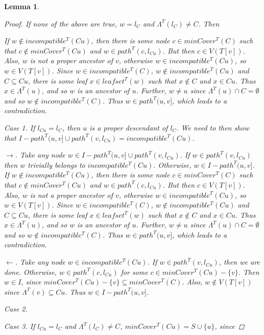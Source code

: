 \documentclass{article}
\newcommand{\leafset}{\Lambda}
\newtheorem{incompatibilityrecursive}[incompatibility]{Lemma}
\begin{document}
\begin{incompatibilityrecursive}
\begin{proof}
            If none of the above are true, $w = l_C$ and $\leafset^{T}(l_C) \neq C$. Then

            If $w \not\in incompatible^{T}(Cu)$, then there is some node $c \in minCover^{T}(C)$ such that $c \not\in minCover^{T}(Cu)$ and $w \in path^{T}(c, l_{Cu})$. But then $c \in V(T[v])$. Also, $w$ is not a proper ancestor of $v$, otherwise $w \in incompatible^{T}(Cu)$, so $w \in V(T[v])$. Since $w \in incompatible^{T}(C)$, $w \not\in incompatible^{T}(Cu)$ and $C \subseteq Cu$, there is some leaf $x \in leafset^{T}(w)$ such that $x \not\in C$ and $x \in Cu$. Thus $x \in \leafset^{T}(u)$, and so $w$ is an ancestor of $u$. Further, $w \neq u$ since $\leafset^{T}(u) \cap C = \emptyset$ and so $w \not\in incompatible^{T}(C)$. Thus $w \in path^{T}(u, v]$, which leads to a contradiction.

            \textit{Case 1.} If $l_{Cu} = l_C$, then $u$ is a proper descendant of $l_C$.  We need to then show that $I - path^{T}(u, v] \cup path^{T}(v, l_{Cu}) = incompatible^{T}(Cu)$.

            $\longrightarrow$. Take any node $w \in I - path^{T}(u, v] \cup path^{T}(v, l_{Cu})$. If $w \in path^{T}(v, l_{Cu})$ then $w$ trivially belongs to $incompatible^{T}(Cu)$. Otherwise, $w \in I - path^{T}(u, v]$. If $w \not\in incompatible^{T}(Cu)$, then there is some node $c \in minCover^{T}(C)$ such that $c \not\in minCover^{T}(Cu)$ and $w \in path^{T}(c, l_{Cu})$. But then $c \in V(T[v])$. Also, $w$ is not a proper ancestor of $v$, otherwise $w \in incompatible^{T}(Cu)$, so $w \in V(T[v])$. Since $w \in incompatible^{T}(C)$, $w \not\in incompatible^{T}(Cu)$ and $C \subseteq Cu$, there is some leaf $x \in leafset^{T}(w)$ such that $x \not\in C$ and $x \in Cu$. Thus $x \in \leafset^{T}(u)$, and so $w$ is an ancestor of $u$. Further, $w \neq u$ since $\leafset^{T}(u) \cap C = \emptyset$ and so $w \not\in incompatible^{T}(C)$. Thus $w \in path^{T}(u, v]$, which leads to a contradiction.

            $\longleftarrow$. Take any node $w \in incompatible^{T}(Cu)$. If $w \in path^{T}(v, l_{Cu})$, then we are done. Otherwise, $w \in path^{T}(c, l_{Cu})$ for some $c \in minCover^{T}(Cu) - \{v\}$. Then $w \in I$, since $minCover^{T}(Cu) - \{v\} \subseteq minCover^{T}(C)$. Also, $w \not\in V(T[v])$ since $\leafset^{T}(v) \subseteq Cu$. Thus $w \in I - path^{T}(u, v]$.

            \textit{Case 2.}

            \textit{Case 3.} If $l_{Cu} = l_C$ and $\leafset^{T}(l_C) \neq C$, $minCover^{T}(Cu) = S \cup \{u\}$, since



\end{proof}
\end{incompatibilityrecursive}
\end{document}

